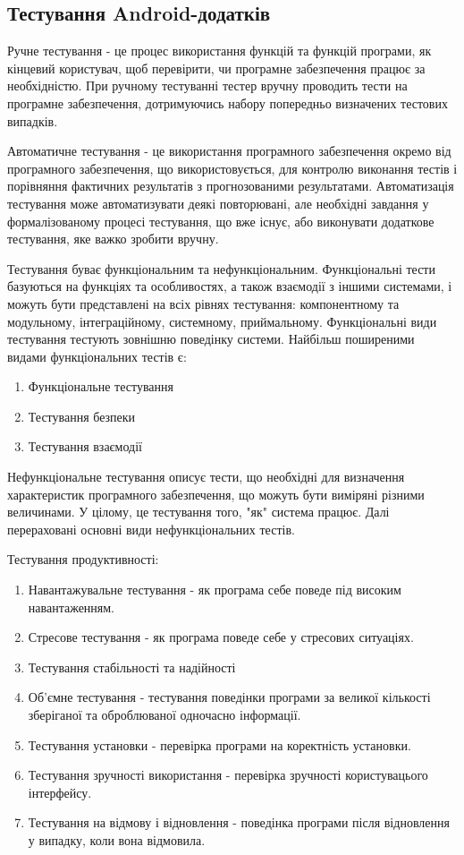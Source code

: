 \subsection{Тестування Android-додатків}

Ручне тестування - це процес використання функцій та функцій програми, як кінцевий користувач, щоб перевірити, чи програмне забезпечення працює за необхідністю. При ручному тестуванні тестер вручну проводить тести на програмне забезпечення, дотримуючись набору попередньо визначених тестових випадків.

Автоматичне тестування - це використання програмного забезпечення окремо від програмного забезпечення, що використовується, для контролю виконання тестів і порівняння фактичних результатів з прогнозованими результатами. Автоматизація тестування може автоматизувати деякі повторювані, але необхідні завдання у формалізованому процесі тестування, що вже існує, або виконувати додаткове тестування, яке важко зробити вручну. \cite{huizinga2007automated}

Тестування буває функціональним та нефункціональним.
Функціональні тести базуються на функціях та особливостях, а також взаємодії з іншими системами, і можуть бути представлені на всіх рівнях тестування: компонентному та модульному, інтеграційному, системному, приймальному. Функціональні види тестування тестують зовнішню поведінку системи. Найбільш поширеними видами функціональних тестів є:

\begin{enumerate}
\item Функціональне тестування
\item Тестування безпеки
\item Тестування взаємодії
\end{enumerate}

Нефункціональне тестування описує тести, що необхідні для визначення характеристик програмного забезпечення, що можуть бути виміряні різними величинами. У цілому, це тестування того, "як" система працює. Далі перераховані основні види нефункціональних тестів.

Тестування продуктивності:

\begin{enumerate}
\item Навантажувальне тестування - як програма себе поведе під високим навантаженням.
\item Стресове тестування - як програма поведе себе у стресових ситуаціях.
\item Тестування стабільності та надійності
\item Об'ємне тестування - тестування поведінки програми за великої кількості зберіганої та оброблюваної одночасно інформації.
\item Тестування установки - перевірка програми на коректність установки.
\item Тестування зручності використання - перевірка зручності користувацього інтерфейсу.
\item Тестування на відмову і відновлення - поведінка програми після відновлення у випадку, коли вона відмовила.
\end{enumerate}

